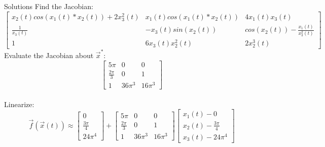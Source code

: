 \documentclass{beamer}
\begin{document}
	\begin{frame}{Solutions}
	 Find the Jacobian: 
	\small
	\[
	        \begin{bmatrix}
	        x_2(t)cos(x_1(t)*x_2(t)) + 2x_3^2(t)& x_1(t)cos(x_1(t)*x_2(t)) & 4x_1(t)x_3(t)\\ 
	        \frac{1}{x_3(t)}& -x_3(t)sin(x_2(t)) &cos(x_2(t)) - \frac{x_1(t)}{x_3^2(t)}  \\ 
	        1 & 6x_3(t)x_2^2(t)& 2 x_2^3(t) 
	        \end{bmatrix}
	\]
	\normalsize
	Evaluate the Jacobian about $\vec{x}^*$:
	\[
	        \begin{bmatrix}
	       5 \pi & 0 & 0\\
	       \frac{2 \pi }{3}& 0 & 1\\
	       1 & 36 \pi^3 & 16 \pi^3
	        \end{bmatrix}
	\]
	\\
	Linearize:
	\begin{equation*}
	 \vec{f}(\vec{x}(t)) \approx 
	 \begin{bmatrix}
	 0 \\ \frac{3\pi }{4} \\ 24 \pi^4
	 \end{bmatrix} +
	 \begin{bmatrix}
	       5 \pi & 0 & 0\\
	       \frac{2 \pi }{3}& 0 & 1\\
	       1 & 36 \pi^3 & 16 \pi^3
	 \end{bmatrix}
	 \begin{bmatrix}
	 x_1(t) - 0 \\ x_2(t) - \frac{3\pi }{4} \\ x_3(t) - 24 \pi^4
	 \end{bmatrix}
	\end{equation*}

	\end{frame}
\end{document}
